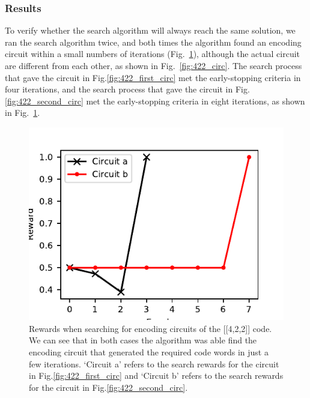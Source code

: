 \documentclass[a4paper,onecolumn,11pt]{quantumarticle}
\begin{document}
\subsubsection{Results}
To verify whether the search algorithm will always reach the same solution, we ran the search algorithm twice, and both times the algorithm found an encoding circuit within a small numbers of iterations (Fig.~\ref{fig:422_reward}), although the actual circuit are different from each other, as shown in Fig.~\ref{fig:422_circ}. The search process that gave the circuit in Fig.\ref{fig:422_first_circ} met the early-stopping criteria in four iterations, and the search process that gave the circuit in Fig.\ref{fig:422_second_circ} met the early-stopping criteria in eight iterations, as shown in Fig.~\ref{fig:422_reward}.
\begin{figure}[H]
    \centering
    \includegraphics[width=0.8\linewidth]{Figures/fig_422_rewards_1_2.pdf}
    \caption{Rewards when searching for encoding circuits of the [[4,2,2]] code. We can see that in both cases the algorithm was able find the encoding circuit that generated the required code words in just a few iterations. `Circuit a' refers to the search rewards for the circuit in Fig.\ref{fig:422_first_circ} and `Circuit b' refers to the search rewards for the circuit in Fig.\ref{fig:422_second_circ}.}\label{fig:422_reward}
\end{figure}
\end{document}
